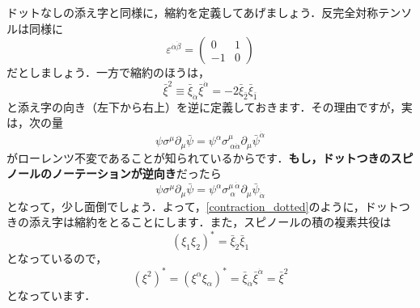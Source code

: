 \documentclass[a4paper,uplatex,dvipdfmx]{jsarticle}
\theoremstyle{definition}
\begin{document}
ドットなしの添え字と同様に，縮約を定義してあげましょう．反完全対称テンソルは同様に
\begin{equation}
  \varepsilon^{\dot{\alpha}\dot{\beta}}
  =
  \begin{pmatrix}
    0 & 1 \\
    -1 & 0
  \end{pmatrix}
\end{equation}
だとしましょう．一方で縮約のほうは，
\begin{equation}
  \bar{\xi}^2
  \equiv
  \bar{\xi}_{\dot{\alpha}}\bar{\xi}^{\dot{\alpha}}
  =
  -2\bar{\xi}_{\bar{2}}\bar{\xi}_{\bar{1}}
  \label{contraction_dotted}
\end{equation}
と添え字の向き（左下から右上）を逆に定義しておきます．その理由ですが，実は，次の量
\begin{equation}
  \psi\sigma^{\mu}\partial_{\mu}\bar{\psi}
  =
  \psi^{\alpha}\sigma^{\mu}_{\ \alpha\dot{\alpha}}\partial_{\mu}\bar{\psi}^{\dot{\alpha}}
\end{equation}
がローレンツ不変であることが知られているからです．\textbf{もし，ドットつきのスピノールのノーテーションが逆向き}だったら
\begin{equation}
  \psi\sigma^{\mu}\partial_{\mu}\bar{\psi}
  =
  \psi^{\alpha}\sigma^{\mu\ \dot{\alpha}}_{\ \alpha}\partial_{\mu}\bar{\psi}_{\dot{\alpha}}
  \tag{??}
\end{equation}
となって，少し面倒でしょう．よって，\eqref{contraction_dotted}のように，ドットつきの添え字は縮約をとることにします．また，スピノールの積の複素共役は
\begin{equation}
  (\xi_{1}\xi_{2})^{*}
  =
  \bar{\xi}_{\dot{2}}\bar{\xi}_{\dot{1}}
\end{equation}
となっているので，
\begin{equation}
  (\xi^2)^{*}
  =
  (\xi^{\alpha}\xi_{\alpha})^{*}
  =
  \bar{\xi}_{\dot{\alpha}}\bar{\xi}^{\dot{\alpha}}
  =
  \bar{\xi}^2
\end{equation}
となっています．

\vspace{1em}
\end{document}
